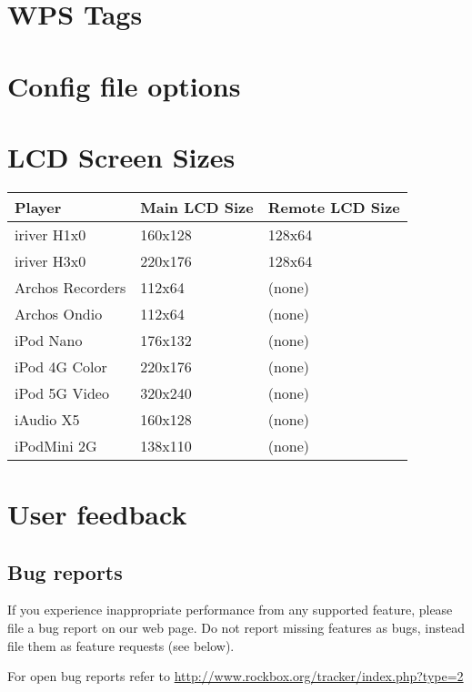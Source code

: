 \chapter{\label{ref:wps_tags}WPS Tags}


\chapter{\label{ref:config_file_options}Config file options}


\chapter{LCD Screen Sizes}
\begin{center}
  \begin{tabularx}{.8\textwidth}{lXX}\toprule
    \textbf{Player} & \textbf{Main LCD Size} & \textbf{Remote LCD Size}\\\midrule
    iriver H1x0 & 160x128 & 128x64\\
    iriver H3x0 & 220x176 & 128x64\\
    Archos Recorders & 112x64 & (none)\\ 
    Archos Ondio & 112x64 & (none)\\
    iPod Nano & 176x132 & (none)\\
    iPod 4G Color & 220x176 & (none)\\
    iPod 5G Video & 320x240 & (none)\\
    iAudio X5 & 160x128 & (none)\\
    iPodMini 2G &138x110 & (none) \\\bottomrule
  \end{tabularx}
\end{center}


\chapter{User feedback}
\section{Bug reports}
If you experience inappropriate performance from any supported feature,
please file a bug report on our web page. Do not report missing
features as bugs, instead file them as feature requests (see below).

For open bug reports refer to
\url{http://www.rockbox.org/tracker/index.php?type=2}

